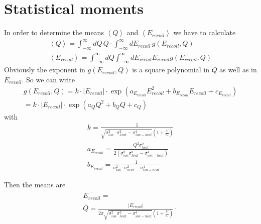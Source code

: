 \section{Statistical moments}
In order to determine the means $\left \langle Q \right \rangle$ and $\left \langle E_{recoil} \right \rangle$ we have to calculate
\begin{gather}
\left \langle Q \right \rangle = \int_{-\infty}^{\infty} dQ \, Q \cdot  \int_{-\infty}^{\infty} dE_{recoil} \, g(E_{recoil},Q) \\
\left \langle E_{recoil} \right \rangle = \int_{-\infty}^{\infty} dQ \int_{-\infty}^{\infty} dE_{recoil} E_{recoil} g(E_{recoil},Q)
\end{gather}
Obviously the exponent in $g(E_{recoil},Q)$ is a square polynomial in $Q$ as well as in $E_{recoil}$.
So we can write
\begin{gather}
g(E_{recoil},Q) = k \cdot \left| E_{recoil} \right| \cdot \exp \left( a_{E_{recoil}} E_{recoil}^2 + b_{E_{recoil}} E_{recoil} + c_{E_{recoil}} \right) \\
= k \cdot \left| E_{recoil} \right| \cdot \exp \left( a_Q Q^2 + b_Q Q + c_Q \right)
\end{gather}
with
\begin{gather}
k = \frac{1}{\sqrt{\sigma_{ion}^2 \cdot \sigma_{heat}^2 - \sigma_{ion-heat}^4} \left(1 + \frac{V}{\epsilon_\gamma} \right)} \\
a_{E_{recoil}} = \frac{Q^2 \sigma_{heat}^2}{2 \left( \sigma_{ion}^2 \sigma_{heat}^2 - \sigma_{ion-heat}^4 \right)} \\
b_{E_{recoil}} = \frac{1}{\sigma_{ion}^2 \cdot \sigma_{heat}^2 - \sigma_{ion-heat}^4}
\end{gather}

Then the means are
\begin{gather}
\overline{E_{recoil}} = \\
\overline{Q} = \frac{\left| E_{recoil} \right| }{2 \pi \sqrt{\sigma_{ion}^2 \sigma_{heat}^2 - \sigma_{ion-heat}^4} \left(1 + \frac{V}{\epsilon_\gamma}\right)} \cdot 
\end{gather}